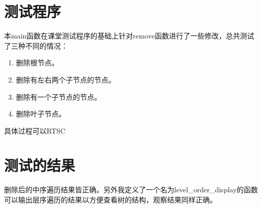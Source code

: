 \documentclass[UTF8]{ctexart}
\begin{document}
\section{测试程序}
本main函数在课堂测试程序的基础上针对remove函数进行了一些修改，总共测试了三种不同的情况：
\begin{enumerate}
    \item 删除根节点。
    \item 删除有左右两个子节点的节点。
    \item 删除有一个子节点的节点。
    \item 删除叶子节点。
\end{enumerate}
\par 具体过程可以RTSC

\section{测试的结果}

\par 删除后的中序遍历结果皆正确。另外我定义了一个名为level\_order\_display的函数可以输出层序遍历的结果以方便查看树的结构，观察结果同样正确。
\end{document}
